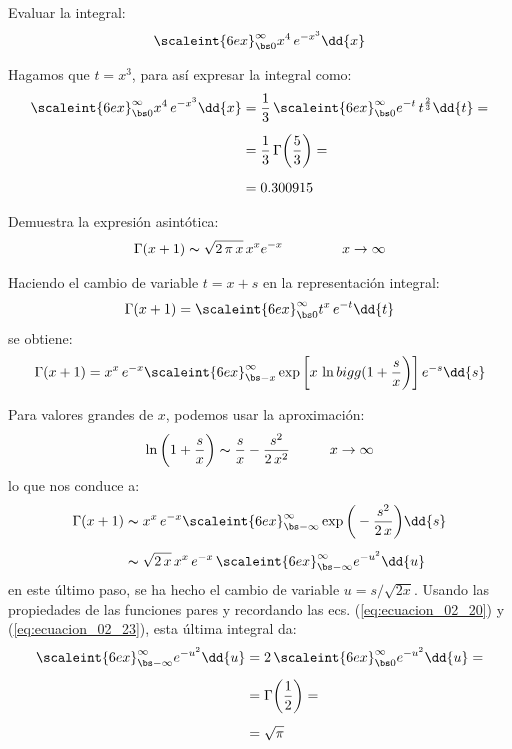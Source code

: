 \begin{ejemplo}
Evaluar la integral:
\begin{align*}
\scaleint{6ex}_{\bs 0}^{\infty} x^{4} \, e^{-x^{3}} \dd{x}
\end{align*}

Hagamos que $t = x^{3}$, para así expresar la integral como:
\begin{align*}
\scaleint{6ex}_{\bs 0}^{\infty} x^{4} \, e^{-x^{3}} \dd{x} &= \dfrac{1}{3} \, \scaleint{6ex}_{\bs 0}^{\infty} e^{-t} \, t^{\frac{2}{3}} \dd{t} = \\[0.5em]
&= \dfrac{1}{3} \, \Gamma \bigg( \dfrac{5}{3} \bigg) = \\[0.5em]
&= 0.300915
\end{align*}
\end{ejemplo}
\begin{ejemplo}
Demuestra la expresión asintótica:
\begin{align*}
\Gamma (x + 1) \thicksim \sqrt{2 \, \pi \, x} \, x^{x} e^{-x} \hspace{1.5cm} x \to \infty
\end{align*}

Haciendo el cambio de variable $t = x + s$ en la representación integral:
\begin{align*}
\Gamma (x + 1) = \scaleint{6ex}_{\bs 0}^{\infty} t^{x} \, e^{-t} \dd{t}
\end{align*}
se obtiene:
\begin{align*}
\Gamma (x + 1) = x^{x} \, e^{-x} \scaleint{6ex}_{\bs -x}^{\infty} \exp\bigg[ x \, \ln bigg( 1 + \dfrac{s}{x} \bigg) \bigg] \, e^{-s} \dd{s}
\end{align*}

Para valores grandes de $x$, podemos usar la aproximación:
\begin{align*}
\ln \bigg( 1 + \dfrac{s}{x} \bigg) \thicksim \dfrac{s}{x} - \dfrac{s^{2}}{2 \, x^{2}} \hspace{1cm} x \to \infty
\end{align*}
lo que nos conduce a:
\begin{align*}
\Gamma (x + 1) &\thicksim x^{x} \, e^{-x} \scaleint{6ex}_{\bs -\infty}^{\infty} \exp\bigg( -\dfrac{s^{2}}{2 \, x} \bigg) \dd{s} \\[0.5em]
&\thicksim \sqrt{2 \, x} \, x^{x} \, e^{-x} \, \scaleint{6ex}_{\bs -\infty}^{\infty} e^{-u^{2}} \dd{u}
\end{align*}
en este último paso, se ha hecho el cambio de variable $u = s / \sqrt{2 x}$. Usando las propiedades de las funciones pares y recordando las ecs. (\ref{eq:ecuacion_02_20}) y (\ref{eq:ecuacion_02_23}), esta última integral da:
\begin{align*}
\scaleint{6ex}_{\bs -\infty}^{\infty} e^{-u^{2}} \dd{u} &= 2 \, \scaleint{6ex}_{\bs 0}^{\infty} e^{-u^{2}} \dd{u} = \\[0.5em]
&= \Gamma \bigg( \dfrac{1}{2} \bigg) = \\[0.5em]
&= \sqrt{\pi}
\end{align*}


\end{ejemplo}
